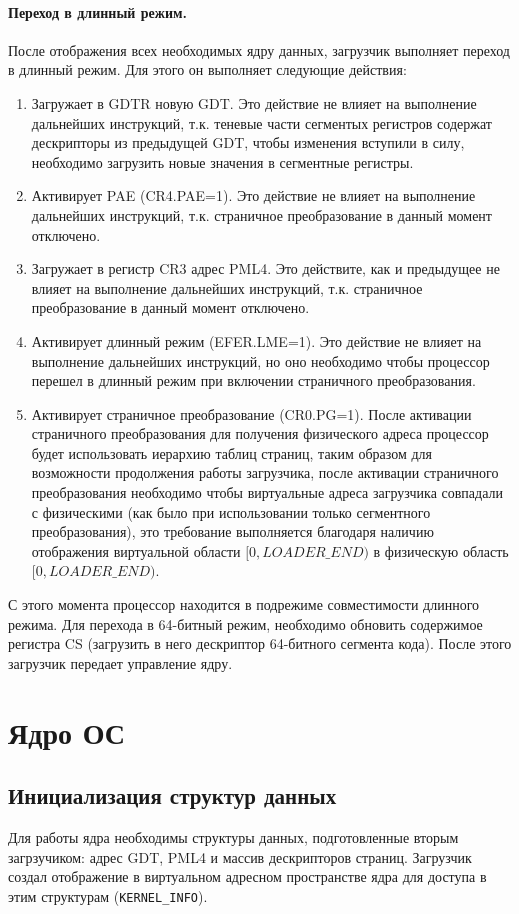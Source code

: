 \paragraph{Переход в длинный режим.} После отображения всех необходимых ядру данных,
загрузчик выполняет переход в длинный режим. Для этого он выполняет следующие действия:
\begin{enumerate}[1.]
\item Загружает в GDTR новую GDT. Это действие не влияет на выполнение дальнейших инструкций,
	т.к. теневые части сегментых регистров содержат дескрипторы из предыдущей GDT, чтобы
	изменения вступили в силу, необходимо загрузить новые значения в сегментные регистры.
\item Активирует PAE (CR4.PAE=1). Это действие не влияет на выполнение дальнейших инструкций,
	т.к. страничное преобразование в данный момент отключено.
\item Загружает в регистр CR3 адрес PML4. Это действите, как и предыдущее не влияет на
	выполнение дальнейших инструкций, т.к. страничное преобразование в данный момент
	отключено.
\item Активирует длинный режим (EFER.LME=1). Это действие не влияет на выполнение дальнейших
	инструкций, но оно необходимо чтобы процессор перешел в длинный режим при включении
	страничного преобразования.
\item Активирует страничное преобразование (CR0.PG=1). После активации страничного преобразования
	для получения физического адреса процессор будет использовать иерархию таблиц страниц,
	таким образом для возможности продолжения работы загрузчика, после активации страничного
	преобразования необходимо чтобы виртуальные адреса загрузчика совпадали с физическими (как
	было при использовании только сегментного преобразования), это требование выполняется
	благодаря наличию отображения виртуальной области $[0, LOADER\_END)$ в физическую область
	$[0, LOADER\_END)$.
\end{enumerate}

С этого момента процессор находится в подрежиме совместимости длинного режима.
Для перехода в 64-битный режим, необходимо обновить содержимое регистра CS (загрузить в
него дескриптор 64-битного сегмента кода). После этого загрузчик передает управление ядру.

\section{Ядро ОС}

\subsection{Инициализация структур данных}
Для работы ядра необходимы структуры данных, подготовленные вторым загрзучиком:
адрес GDT, PML4 и массив дескрипторов страниц. Загрузчик создал отображение в
виртуальном адресном пространстве ядра для доступа в этим структурам (\texttt{KERNEL\_INFO}).

